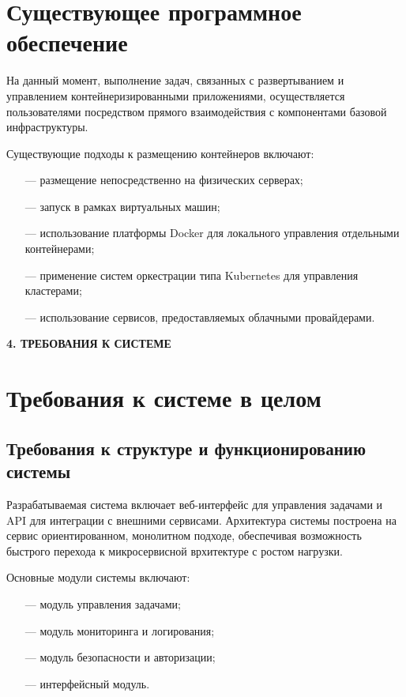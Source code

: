 \section{Существующее программное обеспечение}

На данный момент, выполнение задач, связанных с развертыванием и управлением контейнеризированными приложениями, осуществляется пользователями посредством прямого взаимодействия с компонентами базовой инфраструктуры.

Существующие подходы к размещению контейнеров включают:

\begin{itemize}
\item[---]размещение непосредственно на физических серверах;
\item[---]запуск в рамках виртуальных машин;
\item[---]использование платформы Docker для локального управления отдельными контейнерами;
\item[---]применение систем оркестрации типа Kubernetes для управления кластерами;
\item[---]использование сервисов, предоставляемых облачными провайдерами.
\end{itemize}

\newpage
\begin{center}
  \textbf{\large 4. ТРЕБОВАНИЯ К СИСТЕМЕ}
\end{center}

\section{Требования к системе в целом}

\subsection{Требования к структуре и функционированию системы}

Разрабатываемая система включает веб-интерфейс для управления задачами и API для интеграции с внешними сервисами. Архитектура системы построена на сервис ориентированном, монолитном подходе, обеспечивая возможность быстрого перехода к микросервисной врхитектуре с ростом нагрузки. 

Основные модули системы включают:

\begin{itemize}
\item[---]модуль управления задачами;
\item[---]модуль мониторинга и логирования;
\item[---]модуль безопасности и авторизации;
\item[---]интерфейсный модуль.
\end{itemize}

